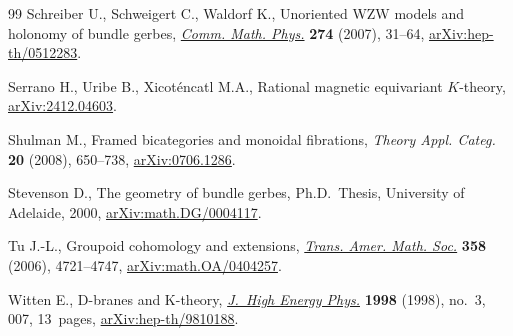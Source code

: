 \documentclass[10pt,a4paper]{amsart}
\numberwithin{equation}{section}
\begin{document}
\begin{thebibliography}{99}
Schreiber U., Schweigert C., Waldorf K., Unoriented {WZW} models and holonomy
 of bundle gerbes,
 \href{https://doi.org/10.1007/s00220-007-0271-x}{\textit{Comm. Math. Phys.}}
 \textbf{274} (2007), 31--64,
 \href{http://arxiv.org/abs/hep-th/0512283}{arXiv:hep-th/0512283}.

Serrano H., Uribe B., Xicot\'encatl M.A., Rational magnetic equivariant
 {$K$}-theory, \href{http://arxiv.org/abs/2412.04603}{arXiv:2412.04603}.

Shulman M., Framed bicategories and monoidal fibrations, \textit{Theory Appl.
 Categ.} \textbf{20} (2008), 650--738,
 \href{http://arxiv.org/abs/0706.1286}{arXiv:0706.1286}.

Stevenson D., The geometry of bundle gerbes, Ph.D.~Thesis, {U}niversity of
 {A}delaide, 2000,
 \href{http://arxiv.org/abs/math.DG/0004117}{arXiv:math.DG/0004117}.

Tu J.-L., Groupoid cohomology and extensions,
 \href{https://doi.org/10.1090/S0002-9947-06-03982-1}{\textit{Trans. Amer.
 Math. Soc.}} \textbf{358} (2006), 4721--4747,
 \href{http://arxiv.org/abs/math.OA/0404257}{arXiv:math.OA/0404257}.

Witten E., D-branes and K-theory,
 \href{https://doi.org/10.1088/1126-6708/2000/03/007}{\textit{J.~High Energy
 Phys.}} \textbf{1998} (1998), no.~3, 007, 13~pages,
 \href{http://arxiv.org/abs/hep-th/9810188}{arXiv:hep-th/9810188}.

\end{thebibliography}
\end{document}
